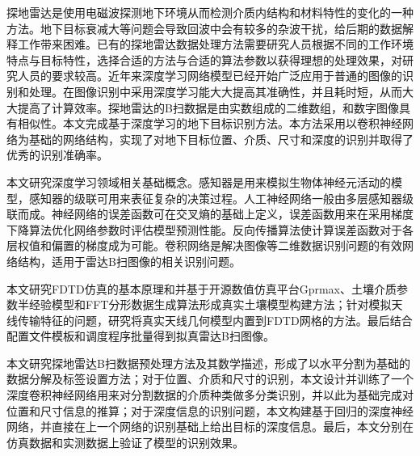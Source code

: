 	\begin{chineseabstract}
    探地雷达是使用电磁波探测地下环境从而检测介质内结构和材料特性的变化的一种方法。地下目标衰减大等问题会导致回波中会有较多的杂波干扰，给后期的数据解释工作带来困难。已有的探地雷达数据处理方法需要研究人员根据不同的工作环境特点与目标特性，选择合适的方法与合适的算法参数以获得理想的处理效果，对研究人员的要求较高。近年来深度学习网络模型已经开始广泛应用于普通的图像的识别和处理。在图像识别中采用深度学习能大大提高其准确性，并且耗时短，从而大大提高了计算效率。探地雷达的B扫数据是由实数组成的二维数组，和数字图像具有相似性。本文完成基于深度学习的地下目标识别方法。本方法采用以卷积神经网络为基础的网络结构，实现了对地下目标位置、介质、尺寸和深度的识别并取得了优秀的识别准确率。

    本文研究深度学习领域相关基础概念。感知器是用来模拟生物体神经元活动的模型，感知器的级联可用来表征复杂的决策过程。人工神经网络一般由多层感知器级联而成。神经网络的误差函数可在交叉熵的基础上定义，误差函数用来在采用梯度下降算法优化网络参数时评估模型预测性能。反向传播算法使计算误差函数对于各层权值和偏置的梯度成为可能。卷积网络是解决图像等二维数据识别问题的有效网络结构，适用于雷达B扫图像的相关识别问题。

    本文研究FDTD仿真的基本原理和并基于开源数值仿真平台Gprmax、土壤介质参数半经验模型和FFT分形数据生成算法形成真实土壤模型构建方法；针对模拟天线传输特征的问题，研究将真实天线几何模型内置到FDTD网格的方法。最后结合配置文件模板和调度程序批量得到拟真雷达B扫图像。

    本文研究探地雷达B扫数据预处理方法及其数学描述，形成了以水平分割为基础的数据分解及标签设置方法；对于位置、介质和尺寸的识别，本文设计并训练了一个深度卷积神经网络用来对分割数据的介质种类做多分类识别，并以此为基础完成对位置和尺寸信息的推算；对于深度信息的识别问题，本文构建基于回归的深度神经网络，并直接在上一个网络的识别基础上给出目标的深度信息。最后，本文分别在仿真数据和实测数据上验证了模型的识别效果。

\end{chineseabstract}

